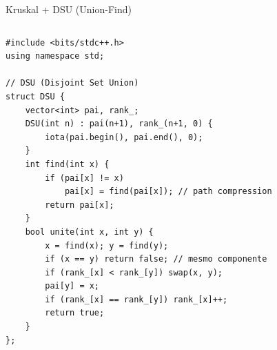\documentclass[aspectratio=169,10pt]{beamer}
\begin{document}
\begin{frame}[fragile,shrink=2]{Kruskal + DSU (Union-Find)}
  \begin{columns}[t]
      \begin{tcolorbox}[caixaCodigo]
        \begin{lstlisting}[style=cppsmall]
#include <bits/stdc++.h>
using namespace std;

// DSU (Disjoint Set Union)
struct DSU {
    vector<int> pai, rank_;
    DSU(int n) : pai(n+1), rank_(n+1, 0) {
        iota(pai.begin(), pai.end(), 0);
    }
    int find(int x) {
        if (pai[x] != x)
            pai[x] = find(pai[x]); // path compression
        return pai[x];
    }
    bool unite(int x, int y) {
        x = find(x); y = find(y);
        if (x == y) return false; // mesmo componente
        if (rank_[x] < rank_[y]) swap(x, y);
        pai[y] = x;
        if (rank_[x] == rank_[y]) rank_[x]++;
        return true;
    }
};


\end{lstlisting}
\end{tcolorbox}
\end{columns}
\end{frame}
\end{document}
